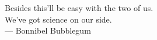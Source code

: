 \cleardoublepage
\thispagestyle{empty}


\vspace*{3cm}


\begin{raggedleft}
	Besides this'll be easy with the two of us. \\ We've got science on our side. \\
	--- Bonnibel Bubblegum\\
\end{raggedleft}

\vspace{4cm}



